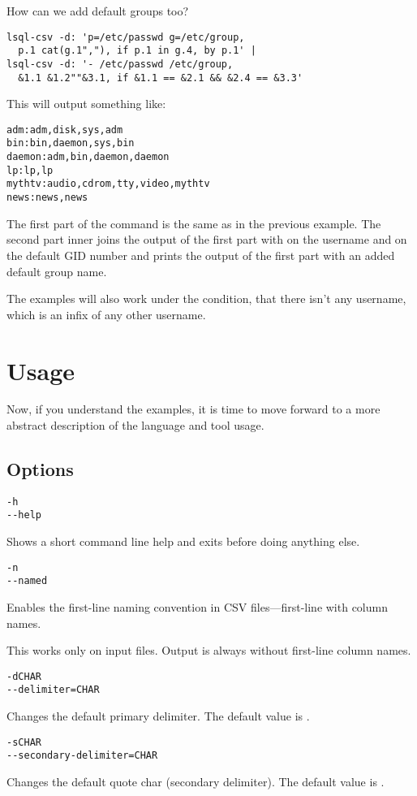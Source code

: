 How can we add default groups too?
\begin{verbatim}
lsql-csv -d: 'p=/etc/passwd g=/etc/group, 
  p.1 cat(g.1","), if p.1 in g.4, by p.1' |
lsql-csv -d: '- /etc/passwd /etc/group, 
  &1.1 &1.2""&3.1, if &1.1 == &2.1 && &2.4 == &3.3'
\end{verbatim}
This will output something like:
\begin{verbatim}
adm:adm,disk,sys,adm
bin:bin,daemon,sys,bin
daemon:adm,bin,daemon,daemon
lp:lp,lp
mythtv:audio,cdrom,tty,video,mythtv
news:news,news
\end{verbatim}

The first part of the command is the same as in the previous example. The second part inner joins the output
of the first part with  on the username and  on the default GID number and prints
the output of the first part with an added default group name.

The examples will also work under the condition, that there isn’t any username,
which is an infix of any other username.

\section{Usage}
Now, if you understand the examples, it is time to move forward to a more abstract description of the language and tool usage.

\subsection{Options}
\begin{verbatim}
-h
--help
\end{verbatim}
Shows a short command line help and exits before doing anything else.

\begin{verbatim}
-n
--named
\end{verbatim}
Enables the first-line naming convention in CSV files---first-line with column names. 

This works only on input files. 
Output is always without first-line column names.

\begin{verbatim}
-dCHAR
--delimiter=CHAR
\end{verbatim}
Changes the default primary delimiter. The default value is \icode{,}.

\begin{verbatim}
-sCHAR
--secondary-delimiter=CHAR
\end{verbatim}
Changes the default quote char (secondary delimiter). The default value is .

